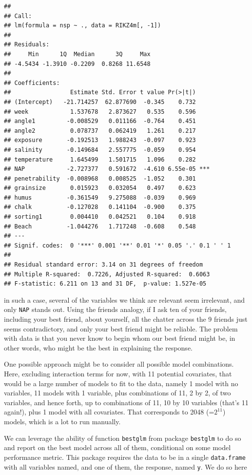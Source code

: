 \documentclass[
]{book}
\begin{document}
\begin{verbatim}
## 
## Call:
## lm(formula = nsp ~ ., data = RIKZ4m[, -1])
## 
## Residuals:
##     Min      1Q  Median      3Q     Max 
## -4.5434 -1.3910 -0.2209  0.8268 11.6548 
## 
## Coefficients:
##                 Estimate Std. Error t value Pr(>|t|)    
## (Intercept)   -21.714257  62.877690  -0.345    0.732    
## week            1.537678   2.873627   0.535    0.596    
## angle1         -0.008529   0.011166  -0.764    0.451    
## angle2          0.078737   0.062419   1.261    0.217    
## exposure       -0.192513   1.988243  -0.097    0.923    
## salinity       -0.149684   2.557775  -0.059    0.954    
## temperature     1.645499   1.501715   1.096    0.282    
## NAP            -2.727377   0.591672  -4.610 6.55e-05 ***
## penetrability  -0.008968   0.008525  -1.052    0.301    
## grainsize       0.015923   0.032054   0.497    0.623    
## humus          -0.361549   9.275088  -0.039    0.969    
## chalk          -0.127028   0.141104  -0.900    0.375    
## sorting1        0.004410   0.042521   0.104    0.918    
## Beach          -1.044276   1.717248  -0.608    0.548    
## ---
## Signif. codes:  0 '***' 0.001 '**' 0.01 '*' 0.05 '.' 0.1 ' ' 1
## 
## Residual standard error: 3.14 on 31 degrees of freedom
## Multiple R-squared:  0.7226, Adjusted R-squared:  0.6063 
## F-statistic: 6.211 on 13 and 31 DF,  p-value: 1.527e-05
\end{verbatim}

in such a case, several of the variables we think are relevant seem irrelevant, and only \texttt{NAP} stands out. Using the friends analogy, if I ask ten of your friends, including your best friend, about yourself, all the chatter across the 9 friends just seems contradictory, and only your best friend might be reliable. The problem with data is that you never know to begin whom our best friend might be, in other words, who might be the best in explaining the response.

One possible approach might be to consider all possible model combinations. Here, excluding interaction terms for now, with 11 potential covariates, that would be a large number of models to fit to the data, namely 1 model with no variables, 11 models with 1 variable, plus combinations of 11, 2 by 2, of two variables, and hence forth, up to combinations of 11, 10 by 10 variables (that's 11 again!), plus 1 model with all covariates. That corresponds to 2048 (=\(2^{11}\)) models, which is a lot to run manually.

We can leverage the ability of function \texttt{bestglm} from package \texttt{bestglm} to do so and report on the best model across all of them, conditional on some model performance metric. This package requires the data to be in a single \texttt{data.frame} with all variables named, and one of them, the response, named \texttt{y}. We do so here
\end{document}
